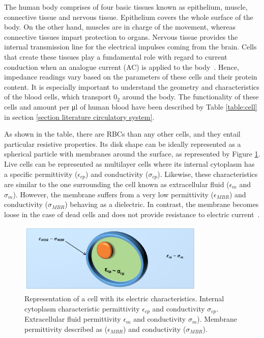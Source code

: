 The human body comprises of four basic tissues known as epithelium, muscle, connective tissue and nervous tissue. Epithelium covers the whole surface of the body. On the other hand, muscles are in charge of the movement, whereas connective tissues impart protection to organs. Nervous tissue provides the internal transmission line for the electrical impulses coming from the brain. Cells that create these tissues play a fundamental role with regard to current conduction when an analogue current (AC) is applied to the body~\cite{lvovich2012impedance}. Hence, impedance readings vary based on the parameters of these cells and their protein content. It is especially important to understand the geometry and characteristics of the blood cells, which transport $0_2$ around the body. The functionality of these cells and amount per \si{\micro\litre} of human blood have been described by Table \ref{table:cell} in section \ref{section literature circulatory system}.

As shown in the table, there are RBCs than any other cells, and they entail particular resistive properties. Its disk shape can be ideally represented as a spherical particle with membranes around the surface, as represented by Figure \ref{fig:cell}. Live cells can be represented as multilayer cells where its internal cytoplasm has a specific permittivity ($\epsilon_{cp}$) and conductivity ($\sigma_{cp}$). Likewise, these characteristics are similar to the one surrounding the cell known as extracellular fluid ($\epsilon_m$ and $\sigma_m$). However, the membrane suffers from a very low permittivity ($\epsilon_{MBR}$) and conductivity ($\sigma_{MBR}$) behaving as a dielectric. In contrast, the membrane becomes loose in the case of dead cells and does not provide resistance to electric current~\cite{lvovich2012impedance}.

\begin{figure}[!htpb]
	\centering
	\includegraphics[width=0.8\textwidth,keepaspectratio, trim={0cm 0cm 0cm 0cm},clip]{figure1}    
	\caption[Cell permeability and conductivity distribution]{Representation of a cell with its electric characteristics. Internal cytoplasm characteristic permittivity $\epsilon_{cp}$ and conductivity $\sigma_{cp}$. Extracellular fluid permittivity $\epsilon_m$ and conductivity $\sigma_m$). Membrane permittivity described as ($\epsilon_{MBR}$) and conductivity ($\sigma_{MBR}$).}
	\label{fig:cell}
\end{figure}

